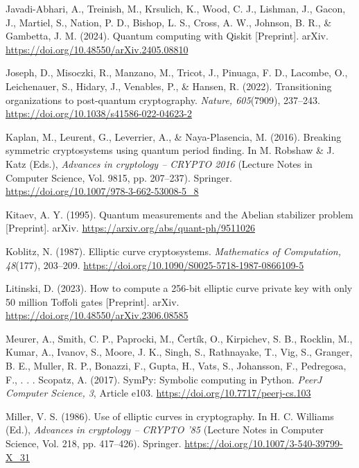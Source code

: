 \documentclass[12pt,oneside]{report}
\begin{document}
Javadi-Abhari, A., Treinish, M., Krsulich, K., Wood, C. J., Lishman, J., Gacon, J., Martiel, S., Nation, P. D., Bishop, L. S., Cross, A. W., Johnson, B. R., \& Gambetta, J. M. (2024). Quantum computing with Qiskit [Preprint]. arXiv. \url{https://doi.org/10.48550/arXiv.2405.08810}
\par

Joseph, D., Misoczki, R., Manzano, M., Tricot, J., Pinuaga, F. D., Lacombe, O., Leichenauer, S., Hidary, J., Venables, P., \& Hansen, R. (2022). Transitioning organizations to post-quantum cryptography. \textit{Nature, 605}(7909), 237–243. \url{https://doi.org/10.1038/s41586-022-04623-2}
\par

Kaplan, M., Leurent, G., Leverrier, A., \& Naya-Plasencia, M. (2016). Breaking symmetric cryptosystems using quantum period finding. In M. Robshaw \& J. Katz (Eds.), \textit{Advances in cryptology – CRYPTO 2016} (Lecture Notes in Computer Science, Vol. 9815, pp. 207–237). Springer. \url{https://doi.org/10.1007/978-3-662-53008-5_8}
\par

Kitaev, A. Y. (1995). Quantum measurements and the Abelian stabilizer problem [Preprint]. arXiv. \url{https://arxiv.org/abs/quant-ph/9511026}
\par

Koblitz, N. (1987). Elliptic curve cryptosystems. \textit{Mathematics of Computation, 48}(177), 203–209. \url{https://doi.org/10.1090/S0025-5718-1987-0866109-5}
\par

Litinski, D. (2023). How to compute a 256-bit elliptic curve private key with only 50 million Toffoli gates [Preprint]. arXiv. \url{https://doi.org/10.48550/arXiv.2306.08585}
\par

Meurer, A., Smith, C. P., Paprocki, M., Čertík, O., Kirpichev, S. B., Rocklin, M., Kumar, A., Ivanov, S., Moore, J. K., Singh, S., Rathnayake, T., Vig, S., Granger, B. E., Muller, R. P., Bonazzi, F., Gupta, H., Vats, S., Johansson, F., Pedregosa, F., . . . Scopatz, A. (2017). SymPy: Symbolic computing in Python. \textit{PeerJ Computer Science, 3}, Article e103. \url{https://doi.org/10.7717/peerj-cs.103}
\par

Miller, V. S. (1986). Use of elliptic curves in cryptography. In H. C. Williams (Ed.), \textit{Advances in cryptology – CRYPTO '85} (Lecture Notes in Computer Science, Vol. 218, pp. 417–426). Springer. \url{https://doi.org/10.1007/3-540-39799-X_31}
\par
\end{document}
